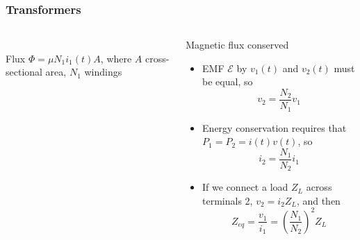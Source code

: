 \documentclass[beamer]{standalone}
\begin{document}
\begin{frame}
 \frametitle{Transformers}
 \begin{columns}
  \begin{column}{0.4\textwidth}
    \\
   Flux $\Phi = \mu N_1 i_1(t) A$, where $A$ cross-sectional area, $N_1$ windings
  \end{column}
  \begin{column}{0.6\textwidth}
   \begin{block}{Magnetic flux conserved}
    \begin{itemize}
     \item EMF $\mathcal{E}$ by $v_1(t)$ and $v_2(t)$ must be equal, so
      \begin{equation*}
       v_2 = \frac{N_2}{N_1} v_1
      \end{equation*}
     \item Energy conservation requires that $P_1 = P_2 = i(t) v(t)$, so
      \begin{equation*}
       i_2 = \frac{N_1}{N_2} i_1
      \end{equation*}
     \item If we connect a load $Z_L$ across terminals 2, $v_2 = i_2 Z_L$, and then
      \begin{equation*}
       Z_{eq} = \frac{v_1}{i_1} = \left(\frac{N_1}{N_2}\right)^2 Z_L
      \end{equation*}
    \end{itemize}
   \end{block}
  \end{column}
 \end{columns}
\end{frame}
\end{document}
